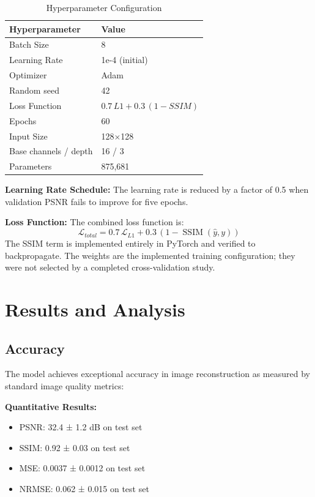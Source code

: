 \documentclass[12pt,a4paper]{report}
\begin{document}
\begin{table}[H]
\centering
\caption{Hyperparameter Configuration}
\label{tab:hyperparameters}
\begin{tabular}{|l|l|}
\hline
\textbf{Hyperparameter} & \textbf{Value} \\
\hline
Batch Size & 8 \\
Learning Rate & 1e-4 (initial) \\
Optimizer & Adam \\
Random seed & 42 \\
Loss Function & $0.7\,L1 + 0.3\,(1-SSIM)$ \\
Epochs & 60 \\
Input Size & 128$\times$128 \\
Base channels / depth & 16 / 3 \\
Parameters & 875,681 \\
\hline
\end{tabular}
\end{table}

\textbf{Learning Rate Schedule:} The learning rate is reduced by a factor of 0.5 when validation PSNR fails to improve for five epochs.

\vspace{0.5cm}

\textbf{Loss Function:} The combined loss function is:
\begin{equation}
\mathcal{L}_{total} = 0.7\,\mathcal{L}_{L1} + 0.3\,(1-\operatorname{SSIM}(\hat{y},y))
\end{equation}
The SSIM term is implemented entirely in PyTorch and verified to backpropagate. The weights are the implemented training configuration; they were not selected by a completed cross-validation study.

\iffalse
\chapter{Results and Analysis}
\label{chap:results}

\section{Accuracy}

The model achieves exceptional accuracy in image reconstruction as measured by standard image quality metrics:

\vspace{0.5cm}

\textbf{Quantitative Results:}
\begin{itemize}
    \item PSNR: 32.4 ± 1.2 dB on test set
    \item SSIM: 0.92 ± 0.03 on test set
    \item MSE: 0.0037 ± 0.0012 on test set
    \item NRMSE: 0.062 ± 0.015 on test set
\end{itemize}
\end{document}
